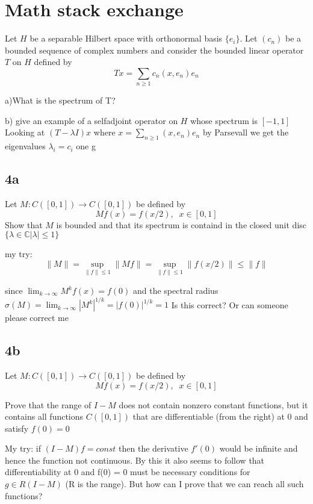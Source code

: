 \documentclass[titlepage]{article}
\begin{document}
\section{Math stack exchange}
Let $H$ be a separable Hilbert space with orthonormal basis $\{e_i\}$. Let $(c_n)$ be a bounded sequence of complex numbers and consider the bounded linear operator $T$ on $H$ defined by $$Tx = \sum_{n\geq 1} c_n(x,e_n)e_n$$

a)What is the spectrum of T?

b) give an example of a selfadjoint operator on $H$ whose spectrum is $[-1,1]$
Looking at $(T - \lambda I)x$ where  $x = \sum_{n\geq 1} (x,e_n)e_n$  by Parsevall we get the eigenvalues $\lambda_i = c_i$
one g
\subsection{4a}
Let $M: C([0,1]) \rightarrow C([0,1])$ be defined by 
$$ Mf(x) = f(x/2), \;\; x\in[0,1]$$
Show that $M$ is bounded and that its spectrum is containd in the closed unit disc
$\{ \lambda \in \mathbb{C} |\lambda| \leq 1 \}$

my try: 
$$ \|M\| = \sup_{\|f\| \leq 1} \|Mf\| = \sup_{\|f\| \leq 1} \|f(x/2) \| \leq \|f\|$$

since $\lim_{k\rightarrow \infty} M^kf(x) = f(0)$ and the spectral radius $\sigma (M) = \lim_{k\rightarrow \infty} |M^k|^{1/k} = |f(0)|^{1/k} = 1$  
Is this correct? Or can someone please correct me

\subsection{4b}
Let $M: C([0,1]) \rightarrow C([0,1])$ be defined by 
$$ Mf(x) = f(x/2), \;\; x\in[0,1]$$

Prove that the range of $I-M$ does not contain nonzero constant functions, but it contains all functions $C([0,1])$ that are differentiable (from the right) at 0 and satisfy $f(0) = 0$

My try:
if $(I - M)f = const$ then the derivative $f'(0)$ would be infinite and hence the function not continuous. By this it also seems to follow that differentiability at 0 and f(0) = 0 must be necessary conditions for $g \in R(I-M)$ (R is the range).
But how can I prove that we can reach all such functions? 
\end{document}
